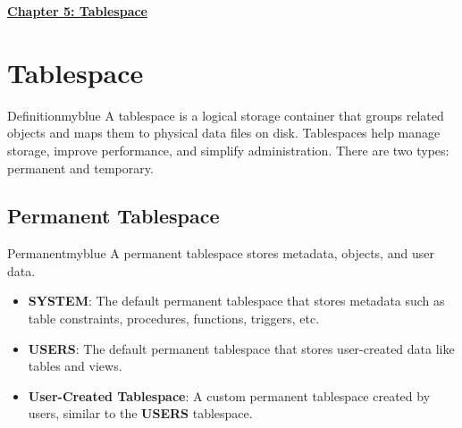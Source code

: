 \newpage 
\null 
\vspace{0.15cm}

\begin{center} 
\Huge{\textbf{\underline{Chapter 5: Tablespace}}}
\end{center}

\vspace{0.25cm}

\setcounter{section}{0}

\vspace{1cm}

\section{Tablespace}
\begin{prettyBox}{Definition}{myblue}
A tablespace is a logical storage container that groups related objects 
and maps them to physical data files on disk. Tablespaces help manage storage, 
improve performance, and simplify administration. There are two types: permanent and temporary.
\end{prettyBox}

\vspace{0.25cm}

\subsection{Permanent Tablespace}
\begin{prettyBox}{Permanent}{myblue}
A permanent tablespace stores metadata, objects, and user data.
\begin{itemize}
    \item \textbf{SYSTEM}: The default permanent tablespace that stores 
          metadata such as table constraints, procedures, functions, triggers, etc.
    \item \textbf{USERS}: The default permanent tablespace that stores 
          user-created data like tables and views.
    \item \textbf{User-Created Tablespace}: A custom permanent tablespace 
          created by users, similar to the \textbf{USERS} tablespace.
\end{itemize}
\end{prettyBox}

\vspace{0.25cm}

